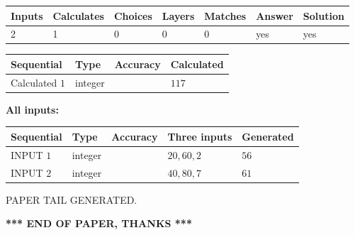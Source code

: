 \documentclass[12pt]{article}
\begin{document}
 

 
   
   
   
   
\noindent\begin{tabular}{|l|l|l|l|l|l|l|}
 \hline
Inputs & Calculates & Choices & Layers & Matches & Answer & Solution \\ \hline
 2  & 
 1  & 
 0
  & 
 0  & 
 0  & 
  yes & 
  yes 
  \\ \hline
 \end{tabular}
   
   
   
   
\noindent{}
   
   
  
  
\noindent\begin{tabular}{|l|l|l|l|}
\hline
 Sequential & Type & Accuracy & Calculated \\ 
\hline
 
 
  Calculated $  1 $ & integer &  & 
  $ 117 $ 
 \\  \hline  
 \end{tabular}
   
   
   
   
\noindent\vspace{0.1in}\hspace{-0.08in} {\textbf{\Large{All inputs: }}}
   
   
  
  
\noindent\begin{tabular}{|l|l|l|l|l|}
\hline
 Sequential & Type & Accuracy & Three inputs & Generated \\ 
\hline
 
 
  INPUT $  1 $ & integer &  & $
 20
 , 
 60
 , 
 2
 $ & $ 56 $ 
 \\  \hline  
 
 
  INPUT $  2 $ & integer &  & $
 40
 , 
 80
 , 
 7
 $ & $ 61 $ 
 \\  \hline  
 \end{tabular}
   
   
   
   
   
   
 \vspace{0.2in}
 
   
   
\vspace{2.0in} PAPER TAIL GENERATED.
   
   
   
   
\vspace{1.0in} 
{\textbf{\large{ *** END OF PAPER, THANKS *** }}} 
   
\end{document}

